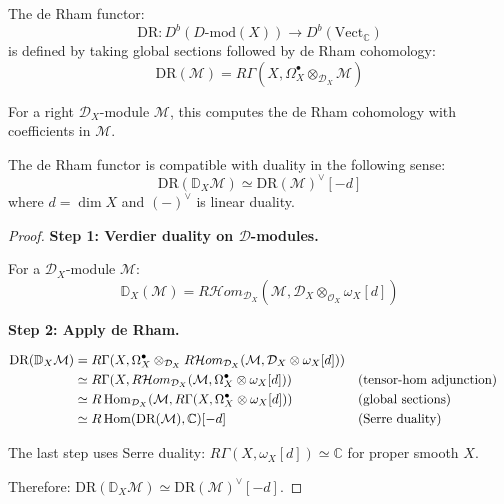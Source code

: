 \begin{definition}\label{def:de-rham-functor}
The de Rham functor:
$$\text{DR}: D^b(D\text{-mod}(X)) \to D^b(\text{Vect}_\mathbb{C})$$
is defined by taking global sections followed by de Rham cohomology:
$$\text{DR}(\mathcal{M}) = R\Gamma(X, \Omega^\bullet_X \otimes_{\mathcal{D}_X} \mathcal{M})$$

For a right $\mathcal{D}_X$-module $\mathcal{M}$, this computes the de Rham cohomology with coefficients in $\mathcal{M}$.
\end{definition}

\begin{proposition}\label{prop:DR-preserves-duality}
The de Rham functor is compatible with duality in the following sense:
$$\text{DR}(\mathbb{D}_X \mathcal{M}) \simeq \text{DR}(\mathcal{M})^\vee[-d]$$
where $d = \dim X$ and $(-)^\vee$ is linear duality.
\end{proposition}

\begin{proof}
\textbf{Step 1: Verdier duality on $\mathcal{D}$-modules.}

For a $\mathcal{D}_X$-module $\mathcal{M}$:
$$\mathbb{D}_X(\mathcal{M}) = R\mathcal{H}om_{\mathcal{D}_X}(\mathcal{M}, \mathcal{D}_X \otimes_{\mathcal{O}_X} \omega_X[d])$$

\textbf{Step 2: Apply de Rham.}

\begin{align*}
\text{DR}(\mathbb{D}_X \mathcal{M}) 
&= R\Gamma(X, \Omega^\bullet_X \otimes_{\mathcal{D}_X} R\mathcal{H}om_{\mathcal{D}_X}(\mathcal{M}, \mathcal{D}_X \otimes \omega_X[d])) \\
&\simeq R\Gamma(X, R\mathcal{H}om_{\mathcal{D}_X}(\mathcal{M}, \Omega^\bullet_X \otimes \omega_X[d])) && \text{(tensor-hom adjunction)} \\
&\simeq R\operatorname{Hom}_{\mathcal{D}_X}(\mathcal{M}, R\Gamma(X, \Omega^\bullet_X \otimes \omega_X[d])) && \text{(global sections)} \\
&\simeq R\operatorname{Hom}(\text{DR}(\mathcal{M}), \mathbb{C})[-d] && \text{(Serre duality)}
\end{align*}

The last step uses Serre duality: $R\Gamma(X, \omega_X[d]) \simeq \mathbb{C}$ for proper smooth $X$.

Therefore: $\text{DR}(\mathbb{D}_X \mathcal{M}) \simeq \text{DR}(\mathcal{M})^\vee[-d]$. \qedhere
\end{proof}

